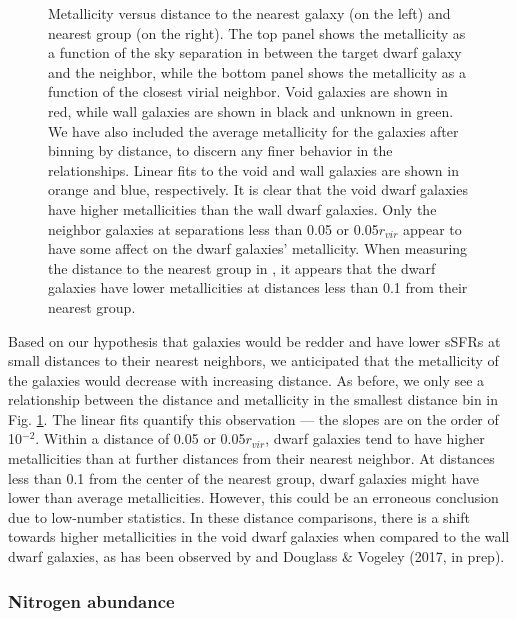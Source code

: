 \begin{figure}
    \caption[Metallicity versus distance to nearest neighbor and group]
    {Metallicity versus distance to the nearest galaxy (on the left) and nearest 
    group (on the right).  The top panel shows the metallicity as a function of 
    the sky separation in \hMpc between the target dwarf galaxy and the 
    neighbor, while the bottom panel shows the metallicity as a function of the 
    closest virial neighbor.  Void galaxies are shown in red, while wall 
    galaxies are shown in black and unknown in green.  We have also included the 
    average metallicity for the galaxies after binning by distance, to discern 
    any finer behavior in the relationships.  Linear fits to the void and wall 
    galaxies are shown in orange and blue, respectively.  It is clear that the 
    void dwarf galaxies have higher metallicities than the wall dwarf galaxies.  
    Only the neighbor galaxies at separations less than 0.05 \hMpc or 
    0.05$r_{vir}$ appear to have some affect on the dwarf galaxies' metallicity.  
    When measuring the distance to the nearest group in \hMpc, it appears that 
    the dwarf galaxies have lower metallicities at distances less than 0.1 \hMpc 
    from their nearest group.}
    \label{fig:OH}
\end{figure}

Based on our hypothesis that galaxies would be redder and have lower sSFRs at 
small distances to their nearest neighbors, we anticipated that the metallicity 
of the galaxies would decrease with increasing distance.  As before, we only see 
a relationship between the distance and metallicity in the smallest distance 
bin in Fig. \ref{fig:OH}.  The linear fits quantify this observation --- the 
slopes are on the order of 10$^{-2}$.  Within a distance of 0.05 \hMpc or 
0.05$r_{vir}$, dwarf galaxies tend to have higher metallicities than at further 
distances from their nearest neighbor.  At distances less than 0.1 \hMpc from 
the center of the nearest group, dwarf galaxies might have lower than average 
metallicities.  However, this could be an erroneous conclusion due to low-number 
statistics.  In these distance comparisons, there is a shift towards higher 
metallicities in the void dwarf galaxies when compared to the wall dwarf 
galaxies, as has been observed by \cite{Douglass17b} and Douglass \& Vogeley 
(2017, in prep).  


\subsubsection{Nitrogen abundance}

